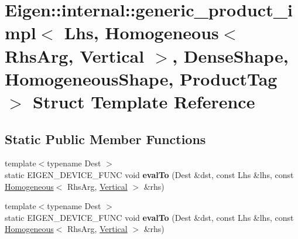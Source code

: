 \hypertarget{struct_eigen_1_1internal_1_1generic__product__impl_3_01_lhs_00_01_homogeneous_3_01_rhs_arg_00_014b037163b7cbbe39357e3613dfc53e44}{}\section{Eigen\+:\+:internal\+:\+:generic\+\_\+product\+\_\+impl$<$ Lhs, Homogeneous$<$ Rhs\+Arg, Vertical $>$, Dense\+Shape, Homogeneous\+Shape, Product\+Tag $>$ Struct Template Reference}
\label{struct_eigen_1_1internal_1_1generic__product__impl_3_01_lhs_00_01_homogeneous_3_01_rhs_arg_00_014b037163b7cbbe39357e3613dfc53e44}
\subsection*{Static Public Member Functions}
\begin{DoxyCompactItemize}
\item 
\mbox{\label{struct_eigen_1_1internal_1_1generic__product__impl_3_01_lhs_00_01_homogeneous_3_01_rhs_arg_00_014b037163b7cbbe39357e3613dfc53e44_af149a2f07a540d7cef32f8bf4eaea476}} 
{\footnotesize template$<$typename Dest $>$ }\\static E\+I\+G\+E\+N\+\_\+\+D\+E\+V\+I\+C\+E\+\_\+\+F\+U\+NC void {\bfseries eval\+To} (Dest \&dst, const Lhs \&lhs, const \hyperlink{group___geometry___module_class_eigen_1_1_homogeneous}{Homogeneous}$<$ Rhs\+Arg, \hyperlink{group__enums_ggad49a7b3738e273eb00932271b36127f7addca718e0564723df21d61b94b1198be}{Vertical} $>$ \&rhs)
\item 
\mbox{\label{struct_eigen_1_1internal_1_1generic__product__impl_3_01_lhs_00_01_homogeneous_3_01_rhs_arg_00_014b037163b7cbbe39357e3613dfc53e44_af149a2f07a540d7cef32f8bf4eaea476}} 
{\footnotesize template$<$typename Dest $>$ }\\static E\+I\+G\+E\+N\+\_\+\+D\+E\+V\+I\+C\+E\+\_\+\+F\+U\+NC void {\bfseries eval\+To} (Dest \&dst, const Lhs \&lhs, const \hyperlink{group___geometry___module_class_eigen_1_1_homogeneous}{Homogeneous}$<$ Rhs\+Arg, \hyperlink{group__enums_ggad49a7b3738e273eb00932271b36127f7addca718e0564723df21d61b94b1198be}{Vertical} $>$ \&rhs)
\end{DoxyCompactItemize}


